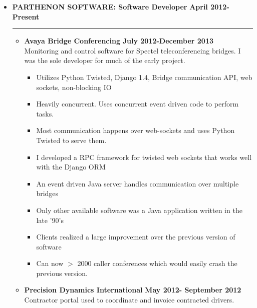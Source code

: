 \documentclass[overlapped]{res}
\begin{document}
\begin{resume}
\begin{itemize}[leftmargin=0in]
    \pagebreak
    \item[] 
        \textbf{PARTHENON SOFTWARE: Software Developer} \hfill \textbf{April 2012-Present} \\[-0.1in] \rule{\textwidth}{0.5pt}
        \begin{itemize}[leftmargin=0in]
            \item[] 
                \begin{samepage}
                    \textbf{Avaya Bridge Conferencing} \hfill \textbf{July 2012-December 2013} \\
                    Monitoring and control software for Spectel teleconferencing bridges.  I was the sole developer for much of the early project.
                    \begin{itemize}
                        \item[\textbullet] Utilizes Python Twisted, Django 1.4, Bridge communication API, web sockets, non-blocking IO
                        \item[\textbullet] Heavily concurrent.  Uses concurrent event driven code to perform tasks.
                        \item[\textbullet] Most communication happens over web-sockets and uses Python Twisted to serve them.
                        \item[\textbullet] I developed a RPC framework for twisted web sockets that works well with the Django ORM
                        \item[\textbullet] An event driven Java server handles communication over multiple bridges
                        \item[\textbullet] Only other available software was a Java application written in the late '90's
                        \item[\textbullet] Clients realized a large improvement over the previous version of software
                        \item[\textbullet] Can now $>$ 2000 caller conferences which would easily crash the previous version.
                    \end{itemize}
                \end{samepage}
            \item[]
                \begin{samepage}
                    \textbf{Precision Dynamics International} \hfill \textbf{May 2012- September 2012} \\
                    Contractor portal used to coordinate and invoice contracted drivers.

\end{samepage}
\end{itemize}
\end{itemize}
\end{resume}
\end{document}
